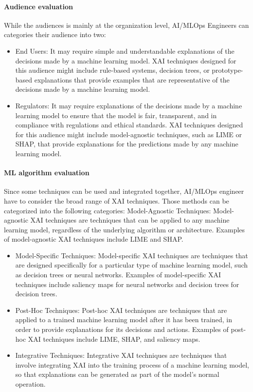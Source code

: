 \documentclass[conference]{IEEEtran}
\begin{document}
\paragraph{Audience evaluation} While the audiences is mainly at the organization level, AI/MLOps Engineers can categories their audience into two:
\begin{itemize}
	\item End Users: It may require simple and understandable explanations of the decisions made by a machine learning model. XAI techniques designed for this audience might include rule-based systems, decision trees, or prototype-based explanations that provide examples that are representative of the decisions made by a machine learning model.
	\item Regulators: It may require explanations of the decisions made by a machine learning model to ensure that the model is fair, transparent, and in compliance with regulations and ethical standards. XAI techniques designed for this audience might include model-agnostic techniques, such as LIME or SHAP, that provide explanations for the predictions made by any machine learning model.
\end{itemize}
\paragraph{ML algorithm evaluation} Since some techniques can be used and integrated together, AI/MLOps engineer have to consider the broad range of XAI techniques. Those methods can be categorized into the following categories:
Model-Agnostic Techniques: Model-agnostic XAI techniques are techniques that can be applied to any machine learning model, regardless of the underlying algorithm or architecture. Examples of model-agnostic XAI techniques include LIME and SHAP.
\begin{itemize}
	\item Model-Specific Techniques: Model-specific XAI techniques are techniques that are designed specifically for a particular type of machine learning model, such as decision trees or neural networks. Examples of model-specific XAI techniques include saliency maps for neural networks and decision trees for decision trees.

	\item Post-Hoc Techniques: Post-hoc XAI techniques are techniques that are applied to a trained machine learning model after it has been trained, in order to provide explanations for its decisions and actions. Examples of post-hoc XAI techniques include LIME, SHAP, and saliency maps.

	\item Integrative Techniques: Integrative XAI techniques are techniques that involve integrating XAI into the training process of a machine learning model, so that explanations can be generated as part of the model's normal operation.
\end{itemize}
\end{document}
